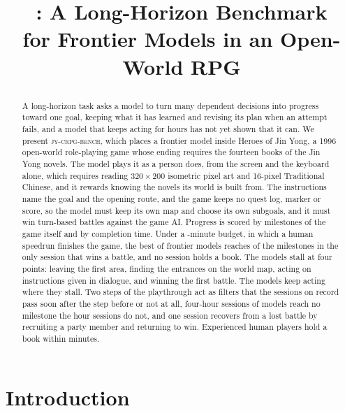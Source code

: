 \documentclass{article} %
\title{\raggedright\bench{}: A Long-Horizon Benchmark \\ for Frontier Models in an Open-World RPG}
\author{}
\newcommand{\bench}{\textsc{jy-crpg-bench}}
\begin{document}
\maketitle
\suppressfloats[t]




\begin{abstract}
A long-horizon task asks a model to turn many dependent decisions into
progress toward one goal, keeping what it has learned and revising its plan
when an attempt fails, and a model that keeps acting for hours has not yet
shown that it can. We present \bench{}, which places a frontier model inside Heroes of Jin Yong, a 1996 open-world role-playing game whose ending requires the fourteen books of the Jin Yong novels. The model plays it as a person does, from the screen and the keyboard alone, which requires reading $320\times200$ isometric pixel art and 16-pixel Traditional Chinese, and it rewards knowing the novels its world is built from. The instructions name the goal and the opening route, and the game keeps no quest log, marker or score, so the model must keep its own map and choose its own subgoals, and it must win turn-based battles against the game AI. Progress is scored by milestones of the game itself and by completion time. Under a
\NbudgetMin{}-minute budget, in which a human speedrun finishes the game, the best of \NmodelsDistinct{} frontier models reaches \Ltop{} of the \Lrungs{} milestones in the only session that wins a battle, and no session holds a book. The models stall at four points: leaving the first area, finding the entrances on the world map, acting on instructions given in dialogue, and winning the first battle. The models keep acting where they stall. Two steps of the playthrough act as filters that the sessions on record pass soon after the step before or not at all, four-hour sessions of \NlongModels{} models reach no milestone the hour sessions do not, and one session recovers from a lost battle by recruiting a party member and returning to win. Experienced human players hold a book within \LhumanBookLast{} minutes.
\end{abstract}

\section{Introduction}
\label{sec:intro}
\end{document}
